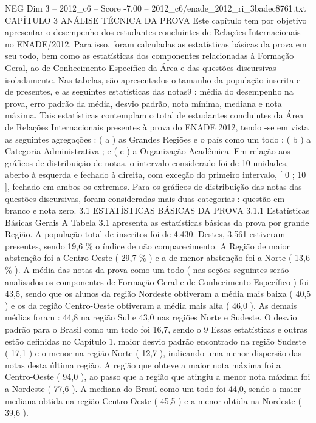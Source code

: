 \begin{textsample}{NEG Dim 3 – 2012\_c6 – Score -7.00 – 2012\_c6/enade\_2012\_ri\_3badec8761.txt}  \label{ex:f3_neg_021}
CAPÍTULO 3 ANÁLISE TÉCNICA DA PROVA Este capítulo tem por objetivo apresentar o desempenho dos estudantes concluintes de Relações Internacionais no ENADE/2012.
Para isso, foram calculadas as estatísticas básicas da prova em seu todo, bem como as estatísticas dos componentes relacionadas à Formação Geral, ao de Conhecimento Específico da Área e das questões discursivas isoladamente.
Nas tabelas, são apresentados o tamanho da população inscrita e de presentes, e as seguintes estatísticas das notas9 : média do desempenho na prova, erro padrão da média, desvio padrão, nota mínima, mediana e nota máxima.
Tais estatísticas contemplam o total de estudantes concluintes da Área de Relações Internacionais presentes à prova do ENADE 2012, tendo -se em vista as seguintes agregações : ( a ) as Grandes Regiões e o país como um todo ; ( b ) a Categoria Administrativa ; e ( c ) a Organização Acadêmica.
Em relação aos gráficos de distribuição de notas, o intervalo considerado foi de 10 unidades, aberto à esquerda e fechado à direita, com exceção do primeiro intervalo, [ 0 ; 10 ], fechado em ambos os extremos.
Para os gráficos de distribuição das notas das questões discursivas, foram consideradas mais duas categorias : questão em branco e nota zero. 3.1 ESTATÍSTICAS BÁSICAS DA PROVA 3.1.1 Estatísticas Básicas Gerais A Tabela 3.1 apresenta as estatísticas básicas da prova por grande Região.
A população total de inscritos foi de 4.430.
Destes, 3.561 estiveram presentes, sendo 19,6 \% o índice de não comparecimento.
A Região de maior abstenção foi a Centro-Oeste ( 29,7 \% ) e a de menor abstenção foi a Norte ( 13,6 \% ).
A média das notas da prova como um todo ( nas seções seguintes serão analisados os componentes de Formação Geral e de Conhecimento Específico ) foi 43,5, sendo que os alunos da região Nordeste obtiveram a média mais baixa ( 40,5 ) e os da região Centro-Oeste obtiveram a média mais alta ( 46,0 ).
As demais médias foram : 44,8 na região Sul e 43,0 nas regiões Norte e Sudeste.
O desvio padrão para o Brasil como um todo foi 16,7, sendo o 9 Essas estatísticas e outras estão definidas no Capítulo 1. maior desvio padrão encontrado na região Sudeste ( 17,1 ) e o menor na região Norte ( 12,7 ), indicando uma menor dispersão das notas desta última região.
A região que obteve a maior nota máxima foi a Centro-Oeste ( 94,0 ), ao passo que a região que atingiu a menor nota máxima foi a Nordeste ( 77,6 ).
A mediana do Brasil como um todo foi 44,0, sendo a maior mediana obtida na região Centro-Oeste ( 45,5 ) e a menor obtida na Nordeste ( 39,6 ).

\end{textsample}
